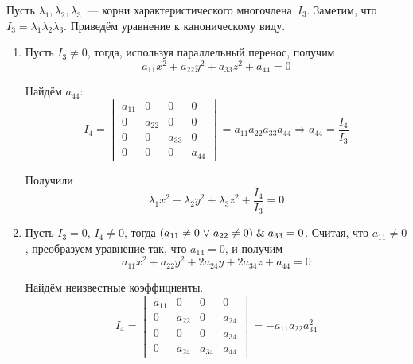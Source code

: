 Пусть $\lambda_1, \lambda_2, \lambda_3$~--- корни характеристического многочлена~$I_3$.
Заметим, что $I_3 = \lambda_1 \lambda_2 \lambda_3$.
Приведём уравнение к каноническому виду.
\begin{enumerate}
	\item Пусть $I_3 \neq 0$, тогда, используя параллельный перенос, получим
	\begin{equation*}
	a_{11} x^2 + a_{22} y^2 + a_{33} z^2 + a_{44} = 0
	\end{equation*}
	
	Найдём $a_{44}$:
	\begin{equation*}
	I_4 =
	\begin{vmatrix}
	a_{11} & 0 & 0 & 0 \\
	0 & a_{22} & 0 & 0 \\
	0 & 0 & a_{33} & 0 \\
	0 & 0 & 0 & a_{44}
	\end{vmatrix} = a_{11} a_{22} a_{33} a_{44} \Rightarrow
	a_{44} = \frac{I_4}{I_3}
	\end{equation*}
	
	Получили
	\begin{equation*}
	\lambda_1 x^2 + \lambda_2 y^2 + \lambda_3 z^2 + \frac{I_4}{I_3} = 0
	\end{equation*}
	
	\item Пусть $I_3 = 0$, $I_4 \neq 0$, тогда $(a_{11} \neq 0 \mathrel{\lor} a_{22} \neq 0) \mathrel{\&} a_{33} = 0$.
	Считая, что $a_{11} \neq 0$, преобразуем уравнение так, что $a_{14} = 0$, и получим
	\begin{equation*}
	a_{11} x^2 + a_{22} y^2 + 2 a_{24} y + 2 a_{34} z + a_{44} = 0
	\end{equation*}
	
	Найдём неизвестные коэффициенты.
	\begin{equation*}
	I_4 =
	\begin{vmatrix}
	a_{11} & 0 & 0 & 0 \\
	0 & a_{22} & 0 & a_{24} \\
	0 & 0 & 0 & a_{34} \\
	0 & a_{24} & a_{34} & a_{44}
	\end{vmatrix} = -a_{11} a_{22} a_{34}^2
	\end{equation*}
	

\end{enumerate}
